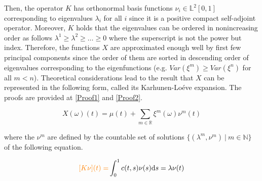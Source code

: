 \documentclass[11pt,twoside,a4paper]{article}
\begin{document}
	Then, the operator $K$ has orthonormal basis functions $\nu_{i} \in \mathbb{L}^{2}[0,1]$ corresponding to eigenvalues $\lambda_{i}$ for all $i$ since it is a positive compact self-adjoint operator. Moreover, $K$ holds that the eigenvalues can be ordered in nonincreasing order as follows $\lambda^{1} \geq \lambda^{2} \geq \dots \geq 0$ where the superscript is not the power but index. Therefore, the functions $X$ are approximated enough well by first few principal components since the order of them are sorted in descending order of eigenvalues corresponding to the eigenfunctions (e.g. $Var(\xi^{m}) \geq Var(\xi^{n})$ for all $m < n$). Theoretical considerations lead to the result that $X$ can be represented in the following form, called its Karhunen-Lo\'{e}ve expansion. The proofs are provided at \ref{Proof1} and \ref{Proof2}.
	
	
	\begin{equation}\label{KarhunenLoeve}
		X(\omega)(t) = \mu(t) + \sum_{m \in \mathbb{R}} \xi^m(\omega) \nu^m(t)
	\end{equation}
	
	where the $\nu^m$ are defined by the countable set of solutions $\{(\lambda^m, \nu^m) \: \vert \: m \in \mathbb{N}\}$ of the following equation.
	
	\begin{equation}
		{\color{orange} [K \nu](t) =}\int_{0}^{1}c(t,s)\nu(s) \mathrm{d}s = \lambda \nu(t)
	\end{equation}
	
\end{document}
